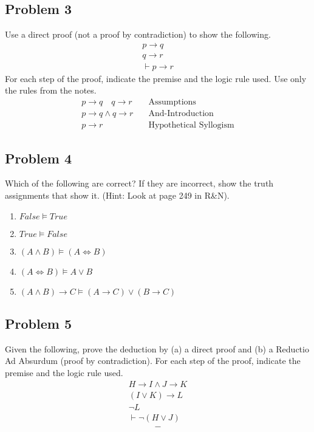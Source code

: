 \documentclass{math}
\begin{document}
\subsection*{Problem 3}
Use a direct proof (not a proof by contradiction) to show the following.
\begin{gather*}
  p\to q \\
  q\to r \\
  \vdash p\to r
\end{gather*}
For each step of the proof, indicate the premise and the logic rule used.
Use only the rules from the notes.
\begin{align*}
  p\to q \quad q\to r &\quad \text{Assumptions} \\
  p\to q\wedge q\to r &\quad \text{And-Introduction} \\
  p\to r &\quad \text{Hypothetical Syllogism}
\end{align*}

\subsection*{Problem 4}
Which of the following are correct? If they are incorrect, show the truth
assignments that show it. (Hint: Look at page 249 in R\&N).
\begin{enumerate}
  \item \( False\models True \)
  \item \( True\models False \)
  \item \( (A\wedge B)\models (A\Leftrightarrow B) \)
  \item \( (A\Leftrightarrow B)\models A\vee B \)
  \item \( (A\wedge B)\to C\models (A\to C)\vee(B\to C) \)
\end{enumerate}

\subsection*{Problem 5}
Given the following, prove the deduction by (a) a direct proof and (b) a
Reductio Ad Absurdum (proof by contradiction). For each step of the proof,
indicate the premise and the logic rule used.
\begin{gather*}
  H\to I\wedge J\to K \\
  (I\vee K)\to L \\
  \neg L \\
  \vdash\neg(H\vee J)
\end{gather*}
\begin{align*}
  -
\end{align*}
\end{document}
